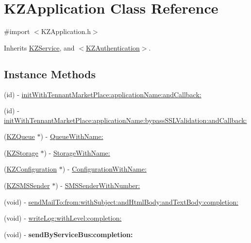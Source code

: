 \hypertarget{interface_k_z_application}{\section{K\-Z\-Application Class Reference}
\label{interface_k_z_application}
}


{\ttfamily \#import $<$K\-Z\-Application.\-h$>$}



Inherits \hyperlink{interface_k_z_service}{K\-Z\-Service}, and \hyperlink{protocol_k_z_authentication-p}{$<$\-K\-Z\-Authentication$>$}.

\subsection*{Instance Methods}
\begin{DoxyCompactItemize}
\item 
(id) -\/ \hyperlink{interface_k_z_application_a8fbb0d914e2c294e14f278c0f874c550}{init\-With\-Tennant\-Market\-Place\-:application\-Name\-:and\-Callback\-:}
\item 
(id) -\/ \hyperlink{interface_k_z_application_a3e5bcfe404c92be87a0949d0cb352a9d}{init\-With\-Tennant\-Market\-Place\-:application\-Name\-:bypass\-S\-S\-L\-Validation\-:and\-Callback\-:}
\item 
(\hyperlink{interface_k_z_queue}{K\-Z\-Queue} $\ast$) -\/ \hyperlink{interface_k_z_application_a8a987bb5c2e04eb15c26a4f41d5d1c84}{Queue\-With\-Name\-:}
\item 
(\hyperlink{interface_k_z_storage}{K\-Z\-Storage} $\ast$) -\/ \hyperlink{interface_k_z_application_a936116d7ffd54141eb2d08cfefef70f9}{Storage\-With\-Name\-:}
\item 
(\hyperlink{interface_k_z_configuration}{K\-Z\-Configuration} $\ast$) -\/ \hyperlink{interface_k_z_application_ad07219694f7ac97bf626e64899baabcf}{Configuration\-With\-Name\-:}
\item 
(\hyperlink{interface_k_z_s_m_s_sender}{K\-Z\-S\-M\-S\-Sender} $\ast$) -\/ \hyperlink{interface_k_z_application_a590ef1401897917c885d8acc5432283b}{S\-M\-S\-Sender\-With\-Number\-:}
\item 
(void) -\/ \hyperlink{interface_k_z_application_a59efa04f31c47d6af60737dd5bb68b8d}{send\-Mail\-To\-:from\-:with\-Subject\-:and\-Html\-Body\-:and\-Text\-Body\-:completion\-:}
\item 
(void) -\/ \hyperlink{interface_k_z_application_a4238b6f0b3c5d0e5474e0ea272840d10}{write\-Log\-:with\-Level\-:completion\-:}
\item 
\hypertarget{interface_k_z_application_a8d96a833e64c8cdda7708726a3160ce3}{(void) -\/ {\bfseries send\-By\-Service\-Bus\-:completion\-:}}\label{interface_k_z_application_a8d96a833e64c8cdda7708726a3160ce3}

\end{DoxyCompactItemize}
